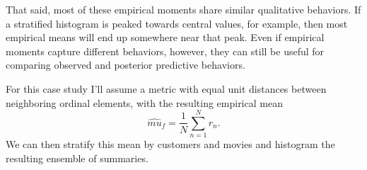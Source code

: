 \documentclass[
  letterpaper,
  DIV=11,
  numbers=noendperiod]{scrartcl}
\newenvironment{Shaded}{\begin{snugshade}}{\end{snugshade}}
\newcommand{\AttributeTok}[1]{\textcolor[rgb]{0.40,0.45,0.13}{#1}}
\newcommand{\ControlFlowTok}[1]{\textcolor[rgb]{0.00,0.23,0.31}{#1}}
\newcommand{\DecValTok}[1]{\textcolor[rgb]{0.68,0.00,0.00}{#1}}
\newcommand{\FloatTok}[1]{\textcolor[rgb]{0.68,0.00,0.00}{#1}}
\newcommand{\FunctionTok}[1]{\textcolor[rgb]{0.28,0.35,0.67}{#1}}
\newcommand{\NormalTok}[1]{\textcolor[rgb]{0.00,0.23,0.31}{#1}}
\newcommand{\OtherTok}[1]{\textcolor[rgb]{0.00,0.23,0.31}{#1}}
\newcommand{\SpecialCharTok}[1]{\textcolor[rgb]{0.37,0.37,0.37}{#1}}
\newcommand{\StringTok}[1]{\textcolor[rgb]{0.13,0.47,0.30}{#1}}
\begin{document}
That said, most of these empirical moments share similar qualitative
behaviors. If a stratified histogram is peaked towards central values,
for example, then most empirical means will end up somewhere near that
peak. Even if empirical moments capture different behaviors, however,
they can still be useful for comparing observed and posterior predictive
behaviors.

For this case study I'll assume a metric with equal unit distances
between neighboring ordinal elements, with the resulting empirical mean
\[
\hat{mu}_{f} = \frac{1}{N} \sum_{n = 1}^{N} r_{n}.
\] We can then stratify this mean by customers and movies and histogram
the resulting ensemble of summaries.

\begin{Shaded}
\end{Shaded}
\end{document}
